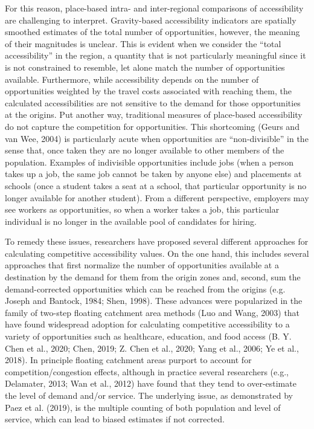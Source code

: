 \documentclass[]{elsarticle} %
\begin{document}
For this reason, place-based intra- and inter-regional comparisons of
accessibility are challenging to interpret. Gravity-based accessibility
indicators are spatially smoothed estimates of the total number of
opportunities, however, the meaning of their magnitudes is unclear. This
is evident when we consider the ``total accessibility'' in the region, a
quantity that is not particularly meaningful since it is not constrained
to resemble, let alone match the number of opportunities available.
Furthermore, while accessibility depends on the number of opportunities
weighted by the travel costs associated with reaching them, the
calculated accessibilities are not sensitive to the demand for those
opportunities at the origins. Put another way, traditional measures of
place-based accessibility do not capture the competition for
opportunities. This shortcoming (Geurs and van Wee, 2004) is
particularly acute when opportunities are ``non-divisible'' in the sense
that, once taken they are no longer available to other members of the
population. Examples of indivisible opportunities include jobs (when a
person takes up a job, the same job cannot be taken by anyone else) and
placements at schools (once a student takes a seat at a school, that
particular opportunity is no longer available for another student). From
a different perspective, employers may see workers as opportunities, so
when a worker takes a job, this particular individual is no longer in
the available pool of candidates for hiring.

To remedy these issues, researchers have proposed several different
approaches for calculating competitive accessibility values. On the one
hand, this includes several approaches that first normalize the number
of opportunities available at a destination by the demand for them from
the origin zones and, second, sum the demand-corrected opportunities
which can be reached from the origins (e.g. Joseph and Bantock, 1984;
Shen, 1998). These advances were popularized in the family of two-step
floating catchment area methods (Luo and Wang, 2003) that have found
widespread adoption for calculating competitive accessibility to a
variety of opportunities such as healthcare, education, and food access
(B. Y. Chen et al., 2020; Chen, 2019; Z. Chen et al., 2020; Yang et al.,
2006; Ye et al., 2018). In principle floating catchment areas purport to
account for competition/congestion effects, although in practice several
researchers (e.g., Delamater, 2013; Wan et al., 2012) have found that
they tend to over-estimate the level of demand and/or service. The
underlying issue, as demonstrated by Paez et al. (2019), is the multiple
counting of both population and level of service, which can lead to
biased estimates if not corrected.
\end{document}
